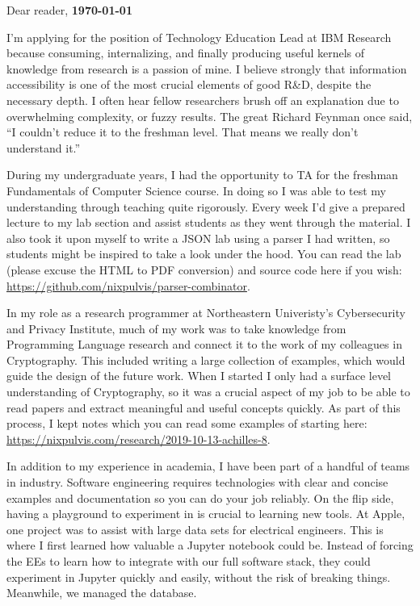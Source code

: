 

\addtolength{\oddsidemargin}{.75in}
\addtolength{\evensidemargin}{.75in}
\addtolength{\textwidth}{-1.5in}
\linespread{1.5}




\vspace{3em}

\noindent Dear reader,
\hfill
{\bf\today}
\vspace{1em}

I'm applying for the position of Technology Education Lead at IBM Research
because consuming, internalizing, and finally producing useful kernels of
knowledge from research is a passion of mine. I believe strongly that
information accessibility is one of the most crucial elements of good R\&D,
despite the necessary depth. I often hear fellow researchers brush off an
explanation due to overwhelming complexity, or fuzzy results. The great Richard
Feynman once said, ``I couldn't reduce it to the freshman level. That means we
really don't understand it.''

During my undergraduate years, I had the opportunity to TA for the freshman
Fundamentals of Computer Science course. In doing so I was able to test my
understanding through teaching quite rigorously. Every week I'd give a prepared
lecture to my lab section and assist students as they went through the
material. I also took it upon myself to write a JSON lab using a parser I had
written, so students might be inspired to take a look under the hood. You can
read the lab (please excuse the HTML to PDF conversion) and source code here if
you wish: \url{https://github.com/nixpulvis/parser-combinator}.

In my role as a research programmer at Northeastern Univeristy's Cybersecurity
and Privacy Institute, much of my work was to take knowledge from Programming
Language research and connect it to the work of my colleagues in Cryptography.
This included writing a large collection of examples, which would guide the
design of the future work. When I started I only had a surface level
understanding of Cryptography, so it was a crucial aspect of my job to be able
to read papers and extract meaningful and useful concepts quickly. As part of
this process, I kept notes which you can read some examples of starting here:
\url{https://nixpulvis.com/research/2019-10-13-achilles-8}.

In addition to my experience in academia, I have been part of a handful of
teams in industry. Software engineering requires technologies with clear and
concise examples and documentation so you can do your job reliably. On the flip
side, having a playground to experiment in is crucial to learning new tools. At
Apple, one project was to assist with large data sets for electrical engineers.
This is where I first learned how valuable a Jupyter notebook could be. Instead
of forcing the EEs to learn how to integrate with our full software stack, they
could experiment in Jupyter quickly and easily, without the risk of breaking
things. Meanwhile, we managed the database.

